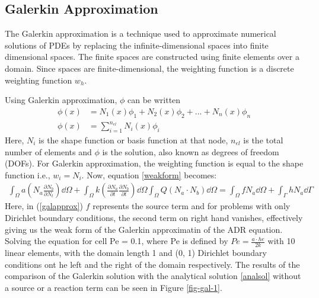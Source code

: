 \documentclass[12pt, oneside]{article}
\begin{document}
\subsection{Galerkin Approximation}
The Galerkin approximation is a technique used to approximate numerical solutions of PDEs by replacing the infinite-dimensional spaces into finite dimensional spaces. The finite spaces are constructed using finite elements over a domain. Since spaces are finite-dimensional, the weighting function is a discrete weighting function $w_h$.

Using Galerkin approximation, $\phi$ can be written
\begin{equation}
    \begin{aligned}
	\phi(x) &= N_1(x)\phi_1 + N_2(x)\phi_2 + ... + N_n(x)\phi_n\\
	\phi \left(x\right) &= \sum_{i=1}^{n_{el}} N_i \left(x\right) \phi_i	
    \end{aligned}
\end{equation}
Here, $N_i$ is the shape function or basis function at that node, $n_{el}$ is the total number of elements and $\phi$ is the solution, also known as degrees of freedom (DOFs). For Galerkin approximation, the weighting function is equal to the shape function i.e., $w_i = N_i$. Now, equation \ref{weakform} becomes:
\begin{equation} \label{galapprox}
    \begin{aligned}
	\int_\Omega a \left( N_a \frac{\partial N_b}{\partial N_t} \right) \dd \Omega + \int_\Omega k \left( \frac{\partial N_a}{\partial t} \frac{\partial N_b}{\partial t} \right) \dd \Omega \int_\Omega Q \left( N_a \cdot N_b \right) \dd \Omega = \int_\Omega f N_a \dd \Omega + \int_\Gamma h N_a \dd \Gamma
    \end{aligned}
\end{equation}
Here, in (\ref{galapprox}) $f$ represents the source term and for problems with only Dirichlet boundary conditions, the second term on right hand vanishes, effectively giving us the weak form of the Galerkin approximatin of the ADR equation. \\
Solving the equation for cell Pe = 0.1, where Pe is defined by $ Pe = \frac{a \cdot he}{2k}$ with 10 linear elements, with the domain length 1 and (0, 1) Dirichlet boundary conditions ont he left and the right of the domain respectively. The results of the comparison of the Galerkin solution with the analytical solution \ref{analsol} without a source or a reaction term can be seen in Figure \ref{fig-gal-1}.\\
\end{document}
